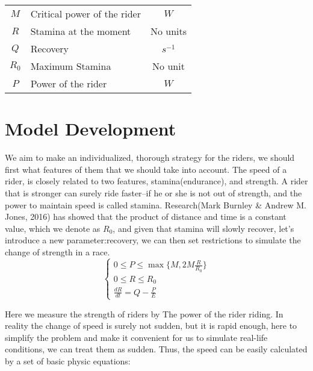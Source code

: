 \documentclass[12pt]{article}
\begin{document}
\begin{center}
{\begin{tabular}{clc}
            $M$           & Critical power of the rider                             & \quad $W$         \\[0.25cm]
            $R$           & Stamina at the moment                                   & \quad No units    \\[0.25cm]
            $Q$           & Recovery                                                & \quad $s^{-1}$    \\[0.25cm]
            $R_0$         & Maximum Stamina                                         & \quad No unit     \\[0.25cm]
            $P$           & Power of the rider                                      & \quad $W$         \\[0.25cm]
        \end{tabular}
    }
\end{center}
\section{Model Development}
We aim to make an individualized, thorough strategy for the riders, we should first what features of them that we should take into account. The speed of a rider,
is closely related to two features, stamina(endurance), and strength. A rider that is stronger can surely ride faster--if he or she is not out of strength, and the power
to maintain speed is called stamina.  Research(Mark Burnley \& Andrew M. Jones, 2016) has showed that the product of distance and time is a constant value, which we denote
as $R_0$, and given that stamina will slowly recover, let's introduce a new parameter:recovery, we can then set restrictions to simulate the change of strength in a race.
\begin{equation}
    \left\{
    \begin{array}{c}
        0                \leqslant  P  \leqslant  \max \{ M,2M\frac{R}{R_0} \} \\
        0                \leqslant  R  \leqslant  R_0                          \\
        \frac{d R}{d t}  =          Q  -          \frac{P}{E}
    \end{array}
    \right.
\end{equation}

Here we measure the strength of riders by The power of the rider riding. In reality the change of speed is surely not sudden, but it is rapid enough, here to
simplify the problem and make it convenient for us to simulate real-life conditions, we can treat them as sudden. Thus, the speed can be easily calculated by a
set of basic physic equations:\
\end{document}
